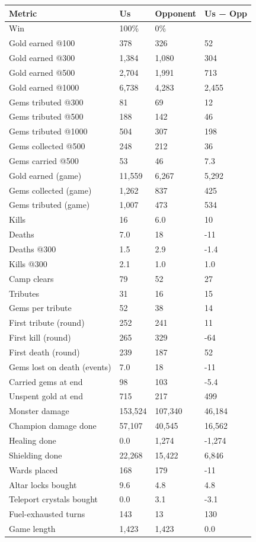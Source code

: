 \documentclass[
  10pt,
]{article}
\newcounter{none} %
\begin{document}
{\def\LTcaptype{none} %
\begin{longtable}[]{@{}llll@{}}
\toprule\noalign{}
Metric & Us & Opponent & Us − Opp \\
\midrule\noalign{}
\endhead
\bottomrule\noalign{}
\endlastfoot
Win & 100\% & 0\% & \\
Gold earned @100 & 378 & 326 & 52 \\
Gold earned @300 & 1,384 & 1,080 & 304 \\
Gold earned @500 & 2,704 & 1,991 & 713 \\
Gold earned @1000 & 6,738 & 4,283 & 2,455 \\
Gems tributed @300 & 81 & 69 & 12 \\
Gems tributed @500 & 188 & 142 & 46 \\
Gems tributed @1000 & 504 & 307 & 198 \\
Gems collected @500 & 248 & 212 & 36 \\
Gems carried @500 & 53 & 46 & 7.3 \\
Gold earned (game) & 11,559 & 6,267 & 5,292 \\
Gems collected (game) & 1,262 & 837 & 425 \\
Gems tributed (game) & 1,007 & 473 & 534 \\
Kills & 16 & 6.0 & 10 \\
Deaths & 7.0 & 18 & -11 \\
Deaths @300 & 1.5 & 2.9 & -1.4 \\
Kills @300 & 2.1 & 1.0 & 1.0 \\
Camp clears & 79 & 52 & 27 \\
Tributes & 31 & 16 & 15 \\
Gems per tribute & 52 & 38 & 14 \\
First tribute (round) & 252 & 241 & 11 \\
First kill (round) & 265 & 329 & -64 \\
First death (round) & 239 & 187 & 52 \\
Gems lost on death (events) & 7.0 & 18 & -11 \\
Carried gems at end & 98 & 103 & -5.4 \\
Unspent gold at end & 715 & 217 & 499 \\
Monster damage & 153,524 & 107,340 & 46,184 \\
Champion damage done & 57,107 & 40,545 & 16,562 \\
Healing done & 0.0 & 1,274 & -1,274 \\
Shielding done & 22,268 & 15,422 & 6,846 \\
Wards placed & 168 & 179 & -11 \\
Altar locks bought & 9.6 & 4.8 & 4.8 \\
Teleport crystals bought & 0.0 & 3.1 & -3.1 \\
Fuel-exhausted turns & 143 & 13 & 130 \\
Game length & 1,423 & 1,423 & 0.0 \\
\end{longtable}
}
\end{document}
